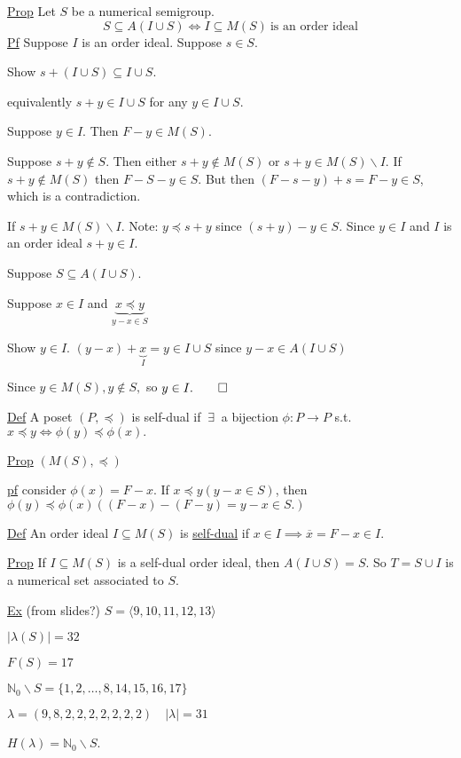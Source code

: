 \documentclass[11pt]{article}
\title{}
\newcommand{\N}{\mathbb{N}}
\newcommand{\exist}{ \ \exists \ }
\begin{document}
 

\underline{Prop} Let $S$ be a numerical semigroup. 
$$S \subseteq A(I \cup S) \iff I \subseteq M(S) \ \text{is an order ideal}$$
\underline{Pf} Suppose $I$ is an order ideal. Suppose $s \in S$. 

Show $s + (I \cup S) \subseteq I \cup S$. 

equivalently $s+y \in I \cup S$ for any $y \in I \cup S$. 

Suppose $y \in I.$ Then $F-y \in M(S).$ 

Suppose $s+y \not\in S.$ Then either $s + y \not \in M(S)$ or $s+y \in M(S) \backslash I$. If $s + y \not \in M(S)$ then $F-S - y \in S.$ But then $(F-s-y)+s = F-y \in S$, which is a contradiction. 

If $s+y \in M(S) \backslash I$. Note: $y \preceq s+y$ since $(s+y) - y \in S.$ Since $y \in I$ and $I $ is an order ideal $s+y \in I.$

Suppose $S \subseteq A(I \cup S)$. 

Suppose $x \in I $ and $\underbrace{x \preceq y}_{y - x \in S}$

Show $y \in I.$
$(y - x)+ \underbrace{x}_{I} = y \in I \cup S$ since $y-x \in A(I \cup S)$

Since $y \in M(S), y \not \in S,$ so $y \in I. \qed$


\underline{Def} A poset $(P, \preceq)$ is self-dual if $\exist$ a bijection $\phi : P \to P$ s.t. $x \preceq y \iff \phi(y) \preceq \phi(x).$

\underline{Prop} $(M(S), \preceq)$

\underline{pf} consider $\phi(x) = F-x.$ If $x \preceq y (y -x \in S)$, then $\phi (y) \preceq \phi(x) ((F-x)-(F-y) = y-x \in S.)$

\underline{Def} An order ideal $I \subseteq M(S)$ is \underline{self-dual} if $x \in I \implies \overline{x} = F-x \in I$.  

\underline{Prop} If $I \subseteq M(S)$ is a self-dual order ideal, then $A(I \cup S) = S.$ So $T=S \cup I$ is a numerical set associated to $S.$

\underline{Ex} (from slides?) $S=\langle 9, 10,11,12,13 \rangle$ 

$|\lambda(S)| = 32$ 

$F(S)=17$

$\N_0 \backslash S = \{1,2, \dots, 8, 14, 15, 16, 17 \}$

$\lambda = (9, 8, 2, 2, 2, 2, 2, 2, 2) \quad |\lambda|=31$

$H(\lambda) = \N_0 \backslash S$. 
\end{document}
